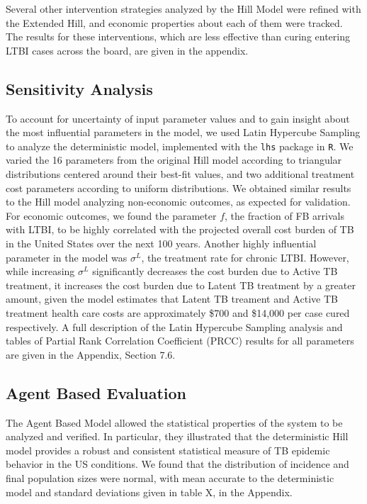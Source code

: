 \documentclass{amsart}
\begin{document}
Several other intervention strategies analyzed by the Hill Model were refined
with the Extended Hill, and economic properties about each of them were tracked.
The results for these interventions, which are less effective than curing
entering LTBI cases across the board, are given in the appendix. 

\subsection{Sensitivity Analysis}
To account for uncertainty of input parameter values and to gain insight about the
most influential parameters in the model, we used Latin Hypercube Sampling to analyze the deterministic model, implemented with the \texttt{lhs} package in \texttt{R}.  We varied 
the 16 parameters from the original Hill model according to triangular distributions centered
around their best-fit values, and two additional treatment cost parameters according to uniform distributions.  We obtained similar results to the Hill model 
analyzing non-economic outcomes, as expected for validation.  For economic 
outcomes, we found the parameter $f$, the fraction of FB arrivals with LTBI,
to be highly correlated with the projected overall cost burden of TB in the United States
over the next 100 years.  Another highly influential parameter in the model was $\sigma^{L}$, 
the treatment rate for chronic LTBI.  However, while increasing $\sigma^{L}$ significantly
decreases the cost burden due to Active TB treatment, it increases the cost burden due to Latent TB treatment by a greater amount, given the model estimates that Latent TB treament and Active
TB treatment health care costs are approximately \$700 and \$14,000 per case cured respectively.  
A full description of the Latin Hypercube Sampling analysis and tables of Partial Rank Correlation Coefficient (PRCC) results for all parameters are given in the Appendix, Section 7.6.  \\

\subsection{Agent Based Evaluation}
The Agent Based Model allowed the statistical properties of the system to be
analyzed and verified. In particular, they illustrated that the deterministic
Hill model provides a robust and consistent statistical measure of TB epidemic
behavior in the US conditions. We found that the distribution of incidence and
final population sizes were normal, with mean accurate to the deterministic
model and standard deviations given in table X, in the Appendix. 
\end{document}
